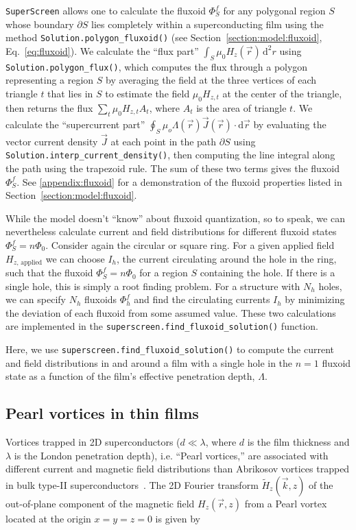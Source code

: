\documentclass[final,3p,times]{elsarticle}
\newcommand{\inline}[1]{\texttt{#1}\xspace}
\newcommand{\SuperScreen}{\inline{SuperScreen}}
\begin{document}
\SuperScreen allows one to calculate the fluxoid $\Phi^f_S$ for any polygonal region $S$ whose boundary $\partial S$ lies completely within a superconducting film using the method \inline{Solution.polygon_fluxoid()} (see Section~\ref{section:model:fluxoid}, Eq.~\ref{eq:fluxoid}). We calculate the ``flux part''  $\int_S\mu_0H_z(\vec{r})\,\mathrm{d}^2r$ using \inline{Solution.polygon_flux()}, which computes the flux through a polygon representing a region $S$ by averaging the field at the three vertices of each triangle $t$ that lies in $S$ to estimate the field $\mu_0H_{z, t}$ at the center of the triangle, then returns the flux $\sum_t \mu_0H_{z,t}A_t$, where $A_t$ is the area of triangle $t$. We calculate the ``supercurrent part'' $\oint_S\mu_o\Lambda(\vec{r})\vec{J}(\vec{r})\cdot\mathrm{d}\vec{r}$ by evaluating the vector current density $\vec{J}$ at each point in the path $\partial S$ using \inline{Solution.interp_current_density()}, then computing the line integral along the path using the trapezoid rule. The sum of these two terms gives the fluxoid $\Phi^f_S$. See \ref{appendix:fluxoid} for a demonstration of the fluxoid properties listed in Section~\ref{section:model:fluxoid}.

While the model doesn't ``know'' about fluxoid quantization, so to speak, we can nevertheless calculate current and field distributions for different fluxoid states $\Phi^f_S=n\Phi_0$. Consider again the circular or square ring. For a given applied field $H_{z,\,\mathrm{applied}}$ we can choose $I_h$, the current circulating around the hole in the ring, such that the fluxoid $\Phi^f_S=n\Phi_0$ for a region $S$ containing the hole. If there is a single hole, this is simply a root finding problem. For a structure with $N_h$ holes, we can specify $N_h$ fluxoids $\Phi^f_h$ and find the circulating currents $I_h$ by minimizing the deviation of each fluxoid from some assumed value. These two calculations are implemented in the \inline{superscreen.find_fluxoid_solution()} function.

Here, we use \inline{superscreen.find_fluxoid_solution()} to compute the current and field distributions in and around a film with a single hole in the $n=1$ fluxoid state as a function of the film's effective penetration depth, $\Lambda$.

\subsection{Pearl vortices in thin films}
\label{section:examples:pearl-vortices}
Vortices trapped in 2D superconductors ($d\ll\lambda$, where $d$ is the film thickness and $\lambda$ is the London penetration depth), i.e. ``Pearl vortices,'' are associated with different current and magnetic field distributions than Abrikosov vortices trapped in bulk type-II superconductors~\cite{Pearl1964-cl}. The 2D Fourier transform $\tilde{H}_z(\vec{k}, z)$ of the out-of-plane component of the magnetic field $H_z(\vec{r}, z)$ from a Pearl vortex located at the origin $x=y=z=0$ is given by
\end{document}
